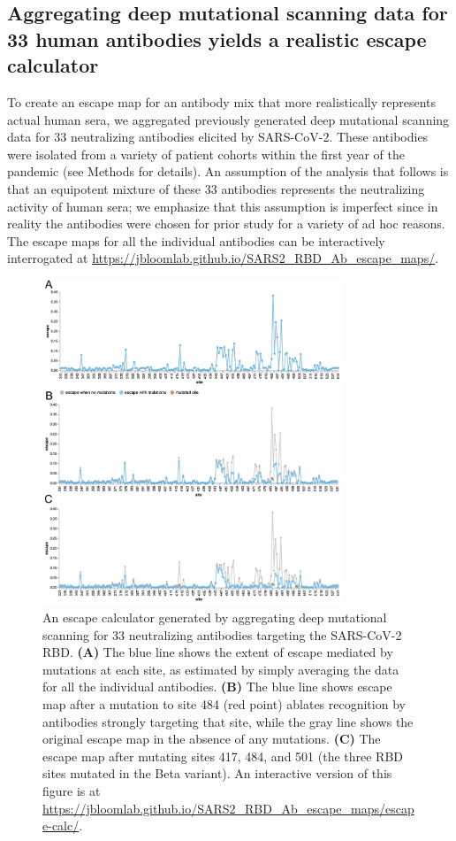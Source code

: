 \documentclass[9pt,twocolumn,twoside]{gsajnl_modified}
\begin{document}
\subsection{Aggregating deep mutational scanning data for 33 human antibodies yields a realistic escape calculator}
To create an escape map for an antibody mix that more realistically represents actual human sera, we aggregated previously generated deep mutational scanning data for 33 neutralizing antibodies elicited by SARS-CoV-2.
These antibodies were isolated from a variety of patient cohorts within the first year of the pandemic (see Methods for details).
An assumption of the analysis that follows is that an equipotent mixture of these 33 antibodies represents the neutralizing activity of human sera; we emphasize that this assumption is imperfect since in reality the antibodies were chosen for prior study for a variety of ad hoc reasons.
The escape maps for all the individual antibodies can be interactively interrogated at \url{https://jbloomlab.github.io/SARS2_RBD_Ab_escape_maps/}.

\begin{figure}
\includegraphics[width=0.8\textwidth]{figures/escape_calc/escape_calc.pdf}
\caption{
An escape calculator generated by aggregating deep mutational scanning for 33 neutralizing antibodies targeting the SARS-CoV-2 RBD.
{\bf (A)} The blue line shows the extent of escape mediated by mutations at each site, as estimated by simply averaging the data for all the individual antibodies.
{\bf (B)} The blue line shows escape map after a mutation to site 484 (red point) ablates recognition by antibodies strongly targeting that site, while the gray line shows the original escape map in the absence of any mutations.
{\bf (C)} The escape map after mutating sites 417, 484, and 501 (the three RBD sites mutated in the Beta variant).
An interactive version of this figure is at \url{https://jbloomlab.github.io/SARS2_RBD_Ab_escape_maps/escape-calc/}.}
\label{fig:escape_calc}
\end{figure}
\end{document}
